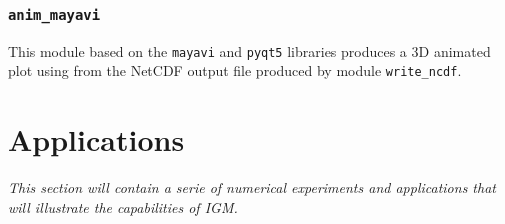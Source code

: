 \documentclass[10pt,twocolumn]{article}
\begin{document}
\subsubsection{\texttt{anim\_mayavi}}
\label{module_mayavi}

This module based on the \texttt{mayavi} and \texttt{pyqt5} libraries
produces a 3D animated plot using from the 
NetCDF output file produced by module \texttt{write\_ncdf}.


\section{Applications} 

\textit{This section will contain a serie of numerical experiments 
and applications that will illustrate the capabilities of IGM. }




\end{document}
